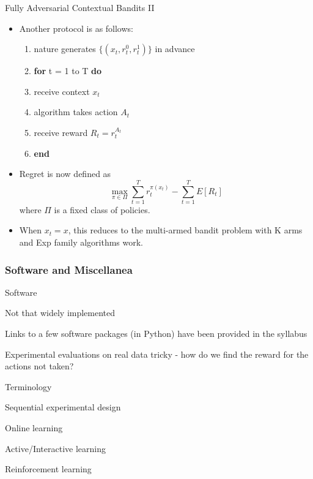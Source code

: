 \documentclass[english]{article}
\begin{document}
\item {Fully Adversarial Contextual Bandits II}
\begin{itemize}
    \item 
    Another protocol is as follows:
\begin{enumerate}
    \item nature generates $\{(x_t, r_t^0, r_t^1)\}$ in advance
    \item \textbf{for} t = 1 to T \textbf{do}
    \item \quad receive context $x_t$
    \item \quad algorithm takes action $A_t$
    \item \quad receive reward $R_t = r_t^{A_t}$
    \item \textbf{end}
\end{enumerate}
\item 
Regret is now defined as \[
\max_{\pi \in \Pi} \sum_{t = 1}^T r_t^{\pi(x_t)} - \sum_{t = 1}^T E[R_t]
\] where $\Pi$ is a fixed class of policies.
\item
When $x_t = x$, this reduces to the multi-armed bandit problem with K arms and Exp family algorithms work. 
\end{itemize}


\eenum

\subsubsection{Software and Miscellanea}

\benum

\item {Software}
\bitem
\item Not that widely implemented
\item Links to a few software packages (in Python) have been provided in the syllabus
\item Experimental evaluations on real data tricky -  how do we find the reward for the actions not taken?
\eitem



\item {Terminology}
\bitem
\item Sequential experimental design
\item Online learning
\item Active/Interactive learning
\item Reinforcement learning
\eitem
\end{document}
